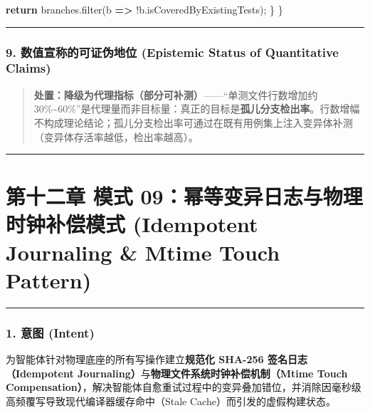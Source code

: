 \documentclass[
]{ctexart}
\newenvironment{Shaded}{}{}
\newcommand{\AttributeTok}[1]{\textcolor[rgb]{0.49,0.56,0.16}{#1}}
\newcommand{\ControlFlowTok}[1]{\textcolor[rgb]{0.00,0.44,0.13}{\textbf{#1}}}
\newcommand{\FunctionTok}[1]{\textcolor[rgb]{0.02,0.16,0.49}{#1}}
\newcommand{\KeywordTok}[1]{\textcolor[rgb]{0.00,0.44,0.13}{\textbf{#1}}}
\newcommand{\NormalTok}[1]{#1}
\newcommand{\OperatorTok}[1]{\textcolor[rgb]{0.40,0.40,0.40}{#1}}
\renewcommand{\_}{\discretionary{}{}{\textunderscore}}
\let\oldsection\section
\renewcommand{\section}{\clearpage\oldsection}
\begin{document}
\begin{Shaded}
\begin{Highlighting}[]
    \ControlFlowTok{return}\NormalTok{ branches}\OperatorTok{.}\FunctionTok{filter}\NormalTok{(b }\KeywordTok{=\textgreater{}} \OperatorTok{!}\NormalTok{b}\OperatorTok{.}\AttributeTok{isCoveredByExistingTests}\NormalTok{)}\OperatorTok{;}
\NormalTok{  \}}
\NormalTok{\}}
\end{Highlighting}
\end{Shaded}

\begin{center}\rule{0.5\linewidth}{0.5pt}\end{center}

\subsubsection{9. 数值宣称的可证伪地位 (Epistemic Status of Quantitative
Claims)}\label{ux6570ux503cux5ba3ux79f0ux7684ux53efux8bc1ux4f2aux5730ux4f4d-epistemic-status-of-quantitative-claims-3}

\begin{quote}
\textbf{处置：降级为代理指标（部分可补测）}------``单测文件行数增加约
30\%\textasciitilde60\%''是代理量而非目标量：真正的目标是\textbf{孤儿分支检出率}。行数增幅不构成理论结论；孤儿分支检出率可通过在既有用例集上注入变异体补测（变异体存活率越低，检出率越高）。
\end{quote}

\begin{center}\rule{0.5\linewidth}{0.5pt}\end{center}

\section{第十二章 模式 09：幂等变异日志与物理时钟补偿模式 (Idempotent Journaling
\& Mtime Touch
Pattern)}\label{ux6a21ux5f0f-09ux5e42ux7b49ux53d8ux5f02ux65e5ux5fd7ux4e0eux7269ux7406ux65f6ux949fux8865ux507fux6a21ux5f0f-idempotent-journaling-mtime-touch-pattern}

\begin{center}\rule{0.5\linewidth}{0.5pt}\end{center}

\subsubsection{1. 意图 (Intent)}\label{ux610fux56fe-intent-8}

为智能体针对物理底座的所有写操作建立\textbf{规范化 SHA-256
签名日志（Idempotent
Journaling）}与\textbf{物理文件系统时钟补偿机制（Mtime Touch
Compensation）}，解决智能体自愈重试过程中的变异叠加错位，并消除因毫秒级高频覆写导致现代编译器缓存命中（Stale
Cache）而引发的虚假构建状态。
\end{document}
